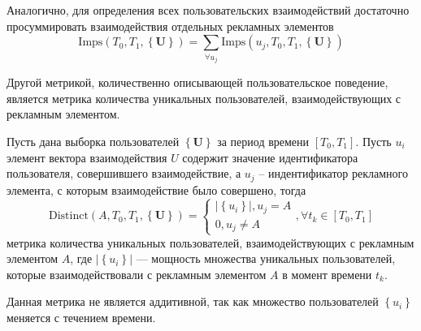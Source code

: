 Аналогично, для определения всех пользовательских взаимодействий достаточно просуммировать взаимодействия отдельных
рекламных элементов
\begin{equation}
    \text{Imps} \left(T_0, T_1, \left\{ \mathbf{U} \right\} \right) =
    \sum \limits_{\forall u_j} \text{Imps} \left(u_j, T_0, T_1, \left\{ \mathbf{U} \right\} \right)
\end{equation}

Другой метрикой, количественно описывающей пользовательское поведение, является метрика количества уникальных пользователей,
взаимодействующих с рекламным элементом.

Пусть дана выборка пользователей $\left\{ \mathbf{U} \right\}$ за период времени $\left[T_0, T_1\right]$. Пусть $u_i$
элемент вектора взаимодействия $U$ содержит значение идентификатора пользователя, совершившего взаимодействие, а $u_j$ -- 
индентификатор рекламного элемента, с которым взаимодействие было совершено, тогда
\begin{equation}
    \text{Distinct}\left( A, T_0, T_1, \left\{\mathbf{U}\right\} \right) =
    \begin{cases}
        \left|\left\{u_i\right\}\right|, u_j = A  \\
        0, u_j \neq A
    \end{cases}, \forall t_k \in \left[T_0, T_1\right]
\end{equation}
метрика количества уникальных пользователей, взаимодействующих с рекламным элементом $A$, где 
$\left|\left\{u_i\right\}\right|$ --- мощность множества уникальных пользователей, которые взаимодействовали с рекламным
элементом $A$ в момент времени $t_k$.

Данная метрика не является аддитивной, так как множество пользователей $\left\{u_i\right\}$ меняется с течением времени.